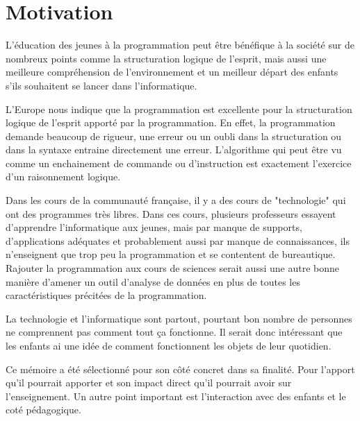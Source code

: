 \section{Motivation}
\label{intro-motivation}
L'éducation des jeunes à la programmation peut être bénéfique à la société sur de nombreux points comme la structuration logique de l'esprit, mais aussi une meilleure compréhension de l'environnement et un meilleur départ des enfants s'ils souhaitent se lancer dans l'informatique.

L'Europe nous indique que la programmation est excellente pour la structuration logique de l'esprit apporté par la programmation. En effet, la programmation demande beaucoup de rigueur, une erreur ou un oubli dans la structuration ou dans la syntaxe entraine directement une erreur. L'algorithme qui peut être vu comme un enchainement de commande ou d'instruction est exactement l'exercice d'un raisonnement logique.

Dans les cours de la communauté française, il y a des cours de "technologie" qui ont des programmes très libres. Dans ces cours, plusieurs professeurs essayent d'apprendre l'informatique aux jeunes, mais par manque de supports, d'applications adéquates et probablement aussi par manque de connaissances, ils n'enseignent que trop peu la programmation et se contentent de bureautique. Rajouter la programmation aux cours de sciences serait aussi une autre bonne manière d'amener un outil d'analyse de données en plus de toutes les caractéristiques précitées de la programmation. %

La technologie et l'informatique sont partout, pourtant bon nombre de personnes ne comprennent pas comment tout ça fonctionne. Il serait donc intéressant que les enfants ai une idée de comment fonctionnent les objets de leur quotidien.

Ce mémoire a été sélectionné pour son côté concret dans sa finalité. Pour l'apport qu'il pourrait apporter et son impact direct qu'il pourrait avoir sur l'enseignement.
Un autre point important est l'interaction avec des enfants et le coté pédagogique. %

